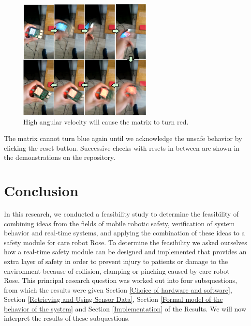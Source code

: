 \documentclass[12pt]{scrreprt}
\begin{document}
\begin{figure}[H]
    \centering
    \includegraphics[width=0.6\textwidth]{Figures/results/lighting_leds/angular_velocity.png}
    \caption{High angular velocity will cause the matrix to turn red.}
    \label{fig:high_angular_velocity}
\end{figure}

The matrix cannot turn blue again until we acknowledge the unsafe behavior by clicking the reset button. Successive checks with resets in between are shown in the demonstrations on the repository.

\newpage
\chapter{Conclusion}
\label{Conclusion}

In this research, we conducted a feasibility study to determine the feasibility of combining ideas from the fields of mobile robotic safety, verification of system behavior and real-time systems, and applying the combination of these ideas to a safety module for care robot Rose. To determine the feasibility we asked ourselves how a real-time safety module can be designed and implemented that provides an extra layer of safety in order to prevent injury to patients or damage to the environment because of collision, clamping or pinching caused by care robot Rose. This principal research question was worked out into four subsquestions, from which the results were given Section \ref{Choice of hardware and software}, Section \ref{Retrieving and Using Sensor Data}, Section \ref{Formal model of the behavior of the system} and Section \ref{Implementation} of the Results. We will now interpret the results of these subquestions.
\end{document}

